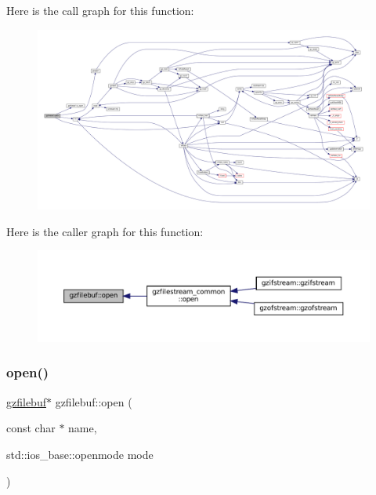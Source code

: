 Here is the call graph for this function\+:
\nopagebreak
\begin{figure}[H]
\begin{center}
\leavevmode
\includegraphics[width=350pt]{classgzfilebuf_ae1fbc989b2dae79dba798556542c147c_cgraph}
\end{center}
\end{figure}
Here is the caller graph for this function\+:
\nopagebreak
\begin{figure}[H]
\begin{center}
\leavevmode
\includegraphics[width=350pt]{classgzfilebuf_ae1fbc989b2dae79dba798556542c147c_icgraph}
\end{center}
\end{figure}
\mbox{\label{classgzfilebuf_a78281ba60675bf8727e92ed23b4a2cc9}} 
\subsubsection{\texorpdfstring{open()}{open()}\hspace{0.1cm}{\footnotesize\ttfamily [2/2]}}
{\footnotesize\ttfamily \mbox{\hyperlink{classgzfilebuf}{gzfilebuf}}$\ast$ gzfilebuf\+::open (\begin{DoxyParamCaption}\item[{const char $\ast$}]{name,  }\item[{std\+::ios\+\_\+base\+::openmode}]{mode }\end{DoxyParamCaption})}



